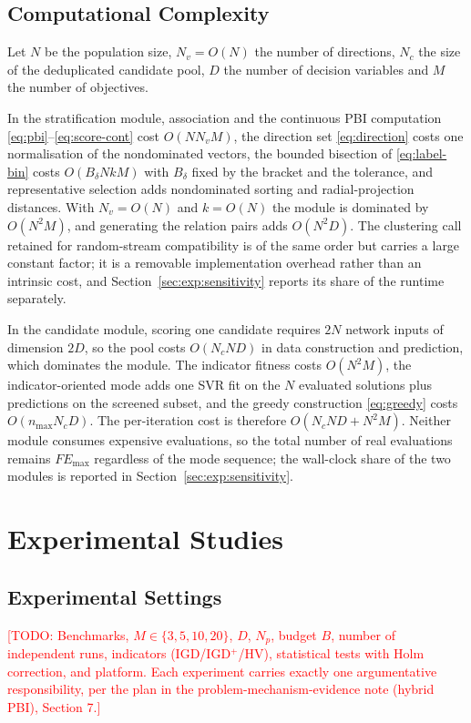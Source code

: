 \documentclass[final,5p,times,twocolumn]{elsarticle}
\newcommand{\TODO}[1]{\textcolor{red}{[TODO: #1]}}
\begin{document}
\subsection{Computational Complexity}
\label{sec:method:complexity}

Let $N$ be the population size, $N_v=O(N)$ the number of directions, $N_c$ the
size of the deduplicated candidate pool, $D$ the number of decision variables
and $M$ the number of objectives.

In the stratification module, association and the continuous PBI computation
\eqref{eq:pbi}--\eqref{eq:score-cont} cost $O(NN_vM)$, the direction set
\eqref{eq:direction} costs one normalisation of the nondominated vectors, the
bounded bisection of \eqref{eq:label-bin} costs $O(B_\delta NkM)$ with
$B_\delta$ fixed by the bracket and the tolerance, and representative selection
adds nondominated sorting and radial-projection distances. With $N_v=O(N)$ and
$k=O(N)$ the module is dominated by $O(N^2M)$, and generating the relation pairs
adds $O(N^2D)$. The clustering call retained for random-stream compatibility is
of the same order but carries a large constant factor; it is a removable
implementation overhead rather than an intrinsic cost, and
Section~\ref{sec:exp:sensitivity} reports its share of the runtime separately.

In the candidate module, scoring one candidate requires $2N$ network inputs of
dimension $2D$, so the pool costs $O(N_cND)$ in data construction and
prediction, which dominates the module. The indicator fitness costs $O(N^2M)$,
the indicator-oriented mode adds one SVR fit on the $N$ evaluated solutions plus
predictions on the screened subset, and the greedy construction \eqref{eq:greedy}
costs $O(n_{\max}N_cD)$. The per-iteration cost is therefore $O(N_cND+N^2M)$.
Neither module consumes expensive evaluations, so the total number of real
evaluations remains $FE_{\max}$ regardless of the mode sequence; the wall-clock
share of the two modules is reported in Section~\ref{sec:exp:sensitivity}.


\section{Experimental Studies}
\label{sec:exp}

\subsection{Experimental Settings}
\label{sec:exp:settings}
\TODO{Benchmarks, $M\in\{3,5,10,20\}$, $D$, $N_p$, budget $B$, number of
independent runs, indicators (IGD/IGD$^+$/HV), statistical tests with Holm
correction, and platform. Each experiment carries exactly one argumentative
responsibility, per the plan in the problem-mechanism-evidence note (hybrid
PBI), Section 7.}
\end{document}
